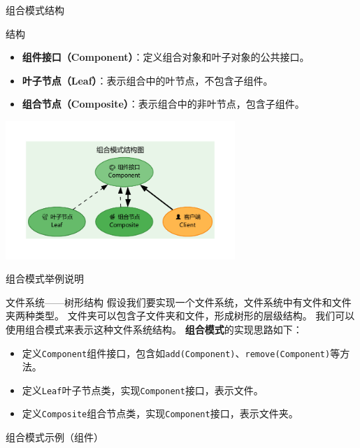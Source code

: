 \documentclass[UTF8,aspectratio=169]{beamer}
\begin{document}
\begin{frame}{组合模式结构}
    \begin{ytublock}{结构}
        \begin{itemize}
            \item \textbf{组件接口（Component）}：定义组合对象和叶子对象的公共接口。
            \item \textbf{叶子节点（Leaf）}：表示组合中的叶节点，不包含子组件。
            \item \textbf{组合节点（Composite）}：表示组合中的非叶节点，包含子组件。
        \end{itemize}
    \end{ytublock}
    \begin{center}
        \includegraphics[width=0.65\textwidth]{images/composite_pattern.pdf}
    \end{center}
\end{frame}

\begin{frame}{组合模式举例说明}
    \begin{exampleytublock}{文件系统——树形结构}
        假设我们要实现一个文件系统，文件系统中有文件和文件夹两种类型。
        文件夹可以包含子文件夹和文件，形成树形的层级结构。
        我们可以使用组合模式来表示这种文件系统结构。
        \textbf{组合模式}的实现思路如下：
        \begin{itemize}
            \item 定义\texttt{Component}组件接口，包含如\texttt{add(Component)}、\texttt{remove(Component)}等方法。
            \item 定义\texttt{Leaf}叶子节点类，实现\texttt{Component}接口，表示文件。
            \item 定义\texttt{Composite}组合节点类，实现\texttt{Component}接口，表示文件夹。
        \end{itemize}
    \end{exampleytublock}
\end{frame}

\begin{frame}{组合模式示例（组件）}
    \begin{columns}
        \begin{column}{0.48\textwidth}
            \inputminted[firstline=1, lastline=18]{cpp}{code/composite_pattern.cpp}
        \end{column}
        \begin{column}{0.48\textwidth}
            \inputminted[firstline=19, lastline=36]{cpp}{code/composite_pattern.cpp}
        \end{column}
    \end{columns}
\end{frame}
\end{document}
